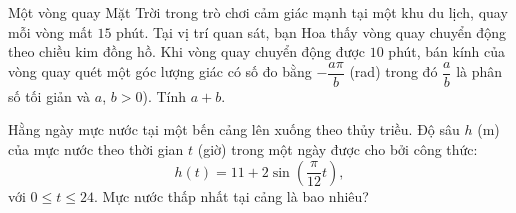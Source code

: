 \begin{bt}%
	Một vòng quay Mặt Trời trong trò chơi cảm giác mạnh tại một khu du lịch, quay mỗi vòng mất $15$ phút. Tại vị trí quan sát, bạn Hoa thấy vòng quay chuyển động theo chiều kim đồng hồ. Khi vòng quay chuyển động được $10$ phút, bán kính của vòng quay quét một góc lượng giác có số đo bằng $-\dfrac{a\pi}{b}$ (rad) trong đó $\dfrac{a}{b}$ là phân số tối giản và $a$, $b > 0$). Tính $a + b$.
\end{bt}

\begin{bt}%
	Hằng ngày mực nước tại một bến cảng lên xuống theo thủy triều. Độ sâu $h$ (m) của mực nước theo thời gian $t$ (giờ) trong một ngày được cho bởi công thức:
	$$h(t)=11+2\sin\left(\dfrac{\pi}{12}t\right),$$
	với $0\le t\le 24$. Mực nước thấp nhất tại cảng là bao nhiêu?
\end{bt}

